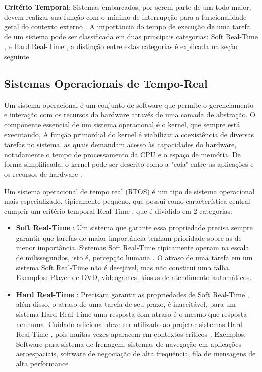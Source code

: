 \textbf{Critério Temporal}: Sistemas embarcados, por serem parte de um todo maior, devem realizar sua função com o mínimo de interrupção para a funcionalidade geral do contexto externo \cite{OperatingSystemConcepts}. A importância do tempo de execução de uma tarefa de um sistema pode ser classificada em duas principais categorias: Soft Real-Time , e Hard Real-Time , a distinção entre estas categorias é explicada na seção seguinte.

\subsection{Sistemas Operacionais de Tempo-Real}

Um sistema operacional é um conjunto de software que permite o gerenciamento e interação com os recursos do hardware através de uma camada de abstração. O componente essencial de um sistema operacional é o kernel, que sempre está executando, A função primordial do kernel é viabilizar a coexistência de diversas tarefas no sistema, as quais demandam acesso às capacidades do hardware, notadamente o tempo de processamento da CPU e o espaço de memória. De forma simplificada, o kernel pode ser descrito como a "cola" entre as aplicações e os recursos de hardware \cite{OperatingSystemConcepts}.

Um sistema operacional de tempo real (RTOS) é um tipo de sistema operacional mais especializado, tipicamente pequeno, que possui como característica central cumprir um critério temporal Real-Time , que é dividido em 2 categorias:

\begin{itemize}
    \item \textbf{Soft Real-Time }: Um sistema que garante essa propriedade precisa sempre garantir que tarefas de  maior importância tenham prioridade sobre as de menor importância. Sistemas Soft Real-Time  tipicamente operam na escala de milissegundos, isto é, percepção humana \cite{SchedAndOptOfDistributedFT}. O atraso de uma tarefa em um sistema Soft Real-Time  não é desejável, mas não constitui uma falha. Exemplos: Player de DVD, videogames, kiosks de atendimento automáticos.
    
    \item \textbf{Hard Real-Time }: Precisam garantir as propriedades de Soft Real-Time , além disso, o atraso de uma tarefa de seu prazo, é inaceitável, para um sistema Hard Real-Time  uma resposta com atraso é o mesmo que resposta nenhuma. Cuidado adicional deve ser utilizado ao projetar sistemas Hard Real-Time , pois muitas vezes aparacem em contextos críticos \cite{ModernOperatingSystems}. Exemplos: Software para sistema de frenagem, sistemas de navegação em aplicações aeroespaciais, software de negociação de alta frequência, fila de mensagens de alta performance
\end{itemize}


